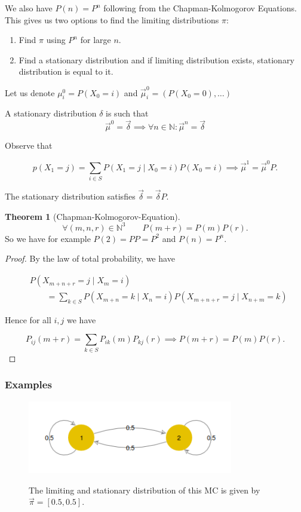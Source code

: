 \documentclass{article}
\theoremstyle{definition}
\newtheorem{theorem}{Theorem}[section]
\begin{document}
We also have $P(n) = P^n$ following from the Chapman-Kolmogorov Equations. This gives us two options to find the limiting distributions $\pi$:

\begin{enumerate}
\item Find $\pi$ using $P^n$ for large $n$.
\item Find a stationary distribution and if limiting distribution exists, stationary distribution is equal to it.
\end{enumerate}

Let us denote $\mu_i^0 = P(X_0 = i)$ and $\vec{\mu}^0_i = \left( P(X_0 = 0), \ldots \right)$

A stationary distribution $\delta$ is such that  
$$
\vec{\mu}^0 = \vec{\delta} \implies \forall n \in \mathbb{N}: \vec{\mu}^n = \vec{\delta}
$$

Observe that 

$$
p(X_1 = j) = \sum_{i \in S} P(X_1 = j \mid X_0 = i ) P(X_0 = i) \implies \vec{\mu}^1 = \vec{\mu}^0 P.
$$

The stationary distribution satisfies $ \vec \delta = \vec \delta P$.

\begin{theorem}[Chapman-Kolmogorov-Equation]
$$
\forall (m, n, r) \in \mathbb{N}^3 \qquad P(m + r) = P(m) P(r).
$$
So we have for example $P(2) = P P = P^2$ and $P(n) = P^n$. 
\begin{proof}
By the law of total probability, we have

\begin{align*}
&P \left( X_{m + n + r} = j \mid X_m = i \right) \\
&\qquad = \sum_{k \in S} P \left( X_{m + n} = k \mid X_n = i \right) P \left( X_{m + n + r} = j \mid X_{n+m} = k \right)
\end{align*}

Hence for all $i,j$ we have

$$
P_{ij}(m+r) = \sum_{k \in S} P_{ik}(m) P_{kj}(r) \implies P(m+r) = P(m) P(r).
$$

\end{proof}
\end{theorem}

\subsubsection*{Examples}

\begin{figure}[h!]
\centering
\includegraphics[width=0.8\textwidth]{images/exmc1}
\label{fig:exmc1}
\caption{ The limiting and stationary distribution of this MC is given by $\vec \pi = [0.5, 0.5]$.}
\end{figure}
\end{document}
